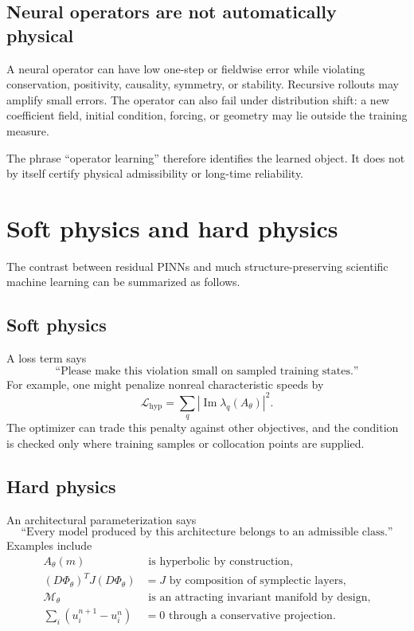 \documentclass[11pt]{article}
\newcommand{\M}{\mathcal{M}}
\begin{document}
\subsection{Neural operators are not automatically physical}

A neural operator can have low one-step or fieldwise error while violating conservation, positivity, causality, symmetry, or stability. Recursive rollouts may amplify small errors. The operator can also fail under distribution shift: a new coefficient field, initial condition, forcing, or geometry may lie outside the training measure.

The phrase ``operator learning'' therefore identifies the learned object. It does not by itself certify physical admissibility or long-time reliability.

\section{Soft physics and hard physics}

The contrast between residual PINNs and much structure-preserving scientific machine learning can be summarized as follows.

\subsection{Soft physics}

A loss term says
\[
\text{``Please make this violation small on sampled training states.''}
\]
For example, one might penalize nonreal characteristic speeds by
\begin{equation}
\mathcal{L}_{\mathrm{hyp}}
=\sum_q
\left|\operatorname{Im}\lambda_q(A_\theta)\right|^2.
\end{equation}
The optimizer can trade this penalty against other objectives, and the condition is checked only where training samples or collocation points are supplied.

\subsection{Hard physics}

An architectural parameterization says
\[
\text{``Every model produced by this architecture belongs to an admissible class.''}
\]
Examples include
\begin{align*}
 A_\theta(m)&\text{ is hyperbolic by construction},\\
 (D\Phi_\theta)^TJ(D\Phi_\theta)&=J\text{ by composition of symplectic layers},\\
 \M_\theta&\text{ is an attracting invariant manifold by design},\\
 \sum_i(u_i^{n+1}-u_i^n)&=0\text{ through a conservative projection}.
\end{align*}
\end{document}
